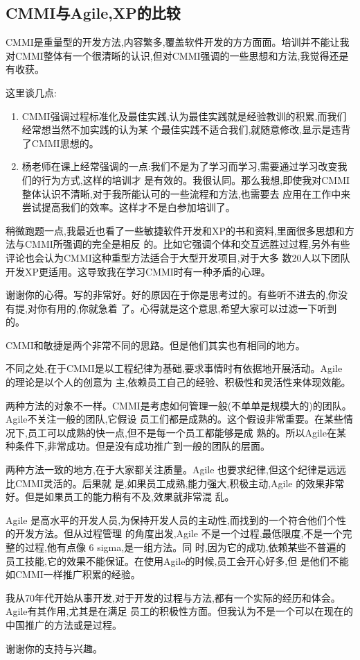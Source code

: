 \documentclass[11pt]{article}
\begin{document}
\subsection{CMMI与Agile,XP的比较}\label{link5}
\begin{staff}

\slogo CMMI是重量型的开发方法,内容繁多,覆盖软件开发的方方面面。培训并不能让我
  对CMMI整体有一个很清晰的认识,但对CMMI强调的一些思想和方法,我觉得还是有收获。

这里谈几点:
\begin{enumerate}
\item CMMI强调过程标准化及最佳实践,认为最佳实践就是经验教训的积累,而我们经常想当然不加实践的认为某
  个最佳实践不适合我们,就随意修改,显示是违背了CMMI思想的。
\item 杨老师在课上经常强调的一点:我们不是为了学习而学习,需要通过学习改变我们的行为方式,这样的培训才
  是有效的。我很认同。那么我想,即使我对CMMI整体认识不清晰,对于我所能认可的一些流程和方法,也需要去
  应用在工作中来尝试提高我们的效率。这样才不是白参加培训了。
\end{enumerate}

稍微跑题一点,我最近也看了一些敏捷软件开发和XP的书和资料,里面很多思想和方法与CMMI所强调的完全是相反
的。比如它强调个体和交互远胜过过程,另外有些评论也会认为CMMI这种重型方法适合于大型开发项目,对于大多
数20人以下团队开发XP更适用。这导致我在学习CMMI时有一种矛盾的心理。
\end{staff}

\begin{yang}

\ylogo 谢谢你的心得。写的非常好。好的原因在于你是思考过的。有些听不进去的,你没有提,对你有用的,你就急着
  了。心得就是这个意思,希望大家可以过滤一下听到的。

  CMMI和敏捷是两个非常不同的思路。但是他们其实也有相同的地方。

  不同之处,在于CMMI是以工程纪律为基础,要求事情时有依据地开展活动。Agile 的理论是以个人的创意为
  主,依赖员工自己的经验、积极性和灵活性来体现效能。

  两种方法的对象不一样。CMMI是考虑如何管理一般(不单单是规模大的)的团队。Agile不关注一般的团队,它假设
  员工们都是成熟的。这个假设非常重要。在某些情况下,员工可以成熟的快一点,但不是每一个员工都能够是成
  熟的。所以Agile在某种条件下,非常成功。但是没有成功推广到一般的团队的层面。

  两种方法一致的地方,在于大家都关注质量。Agile 也要求纪律,但这个纪律是远远比CMMI灵活的。后果就
  是,如果员工成熟,能力强大,积极主动,Agile 的效果非常好。但是如果员工的能力稍有不及,效果就非常混
  乱。

  Agile 是高水平的开发人员,为保持开发人员的主动性,而找到的一个符合他们个性的开发方法。但从过程管理
  的角度出发,Agile 不是一个过程,最低限度,不是一个完整的过程,他有点像 6 sigma,是一组方法。同
  时,因为它的成功,依赖某些不普遍的员工技能,它的效果不能保证。在使用Agile的时候,员工会开心好多,但
  是他们不能如CMMI一样推广积累的经验。

  我从70年代开始从事开发,对于开发的过程与方法,都有一个实际的经历和体会。Agile有其作用,尤其是在满足
  员工的积极性方面。但我认为不是一个可以在现在的中国推广的方法或是过程。

  谢谢你的支持与兴趣。
\end{yang}
\end{document}
